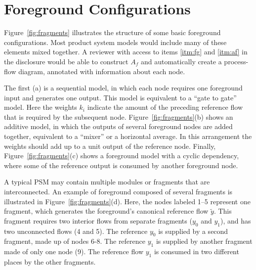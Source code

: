 
\section{Foreground Configurations}

Figure~\ref{fig:fragments} illustrates the structure of some basic foreground configurations.  Most product system models would include many of these elements mixed together.  A reviewer with access to items \ref{itm:fg} and \ref{itm:af} in the disclosure would be able to construct $A_f$ and automatically create a process-flow diagram, annotated with information about each node.



The first (a) is a sequential model, in which each node requires one foreground input and generates one output. This model is equivalent to a ``gate to gate'' model.  Here the weights $k_i$ indicate the amount of the preceding reference flow that is required by the subsequent node.  Figure~\ref{fig:fragments}(b) shows an additive model, in which the outputs of several foreground nodes are added together, equivalent to a ``mixer'' or a horizontal average.  In this arrangement the weights %
should add up to a unit output of the reference node.  Finally, Figure~\ref{fig:fragments}(c) shows a foreground model with a cyclic dependency, where some of the reference output is consumed by another foreground node.

A typical PSM may contain multiple modules or fragments that are interconnected.  An example of foreground composed of several fragments is illustrated in Figure~\ref{fig:fragments}(d).  Here, the nodes labeled 1--5 represent one fragment, which generates the foreground's canonical reference flow $\tilde{y}$. This fragment requires two interior flows from separate fragments ($y_0$ and $y_1$), and has two unconnected flows (4 and 5).  The reference $y_0$ is supplied by a second fragment, made up of nodes 6-8.  The reference $y_1$ is supplied by another fragment made of only one node (9). The reference flow $y_1$ is consumed in two different places by the other fragments.





